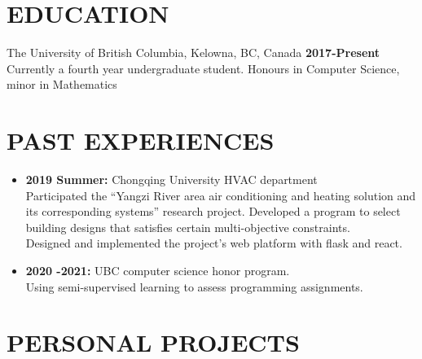 \documentclass{res}
\begin{document}

\address{\textbf{Email:} jimmy123good@hotmail.com \\
        \textbf{Github: }https://github.com/ailrk \\
         \textbf{Blog:}    https://ailrk.github.io/home \\
         \textbf{Contact:}  (250) 899 2600}
\begin{resume}

\section{EDUCATION}
The University of British Columbia, Kelowna, BC, Canada  \hspace{1.2in} \textbf{2017-Present}\\
    Currently a fourth year undergraduate student. Honours in Computer Science, minor in Mathematics \\

\section{PAST EXPERIENCES}
\begin{itemize}[leftmargin=-.1in]
    \item \textbf{2019 Summer:} Chongqing University HVAC department
        \vspace{0.05in}\\ Participated the ``Yangzi River area air conditioning and heating solution and its corresponding systems'' research project. Developed a program to select building designs that satisfies certain multi-objective constraints. \\
     Designed and implemented the project's web platform with flask and react. \\
    \item \textbf{2020 -2021: } UBC computer science honor program. \\
        \vspace{0.05in} Using semi-supervised learning to assess programming assignments. \\


\end{itemize}

\vspace{-0.2in}
\section{PERSONAL PROJECTS}


\end{resume}
\end{document}
